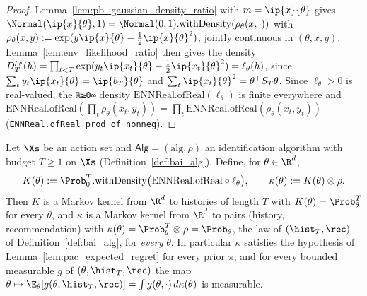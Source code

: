 \begin{proof}
\leanok
{}
Lemma~\ref{lem:pb_gaussian_density_ratio} with $m = \ip{x}{\theta}$ gives
$\Normal(\ip{x}{\theta},1) = \Normal(0,1).\mathrm{withDensity}(\rho_\theta(x,\cdot))$ with
$\rho_\theta(x,y) := \exp(y\ip{x}{\theta}-\tfrac12\ip{x}{\theta}^2)$, jointly continuous in
$(\theta,x,y)$. Lemma~\ref{lem:env_likelihood_ratio} then gives the density
$D_T^{\rho_\theta}(h) = \prod_{t<T}\exp(y_t\ip{x_t}{\theta}-\tfrac12\ip{x_t}{\theta}^2) = \ell_\theta(h)$,
since $\sum_ty_t\ip{x_t}{\theta} = \ip{b_T}{\theta}$ and
$\sum_t\ip{x_t}{\theta}^2 = \theta^\top S_T\theta$. Since $\ell_\theta > 0$ is real-valued, the
\texttt{ℝ≥0∞} density $\mathrm{ENNReal.ofReal}(\ell_\theta)$ is finite everywhere and
$\mathrm{ENNReal.ofReal}(\prod_t\rho_\theta(x_t,y_t)) = \prod_t\mathrm{ENNReal.ofReal}(\rho_\theta(x_t,y_t))$
(\texttt{ENNReal.ofReal\_prod\_of\_nonneg}).
\end{proof}

\begin{lemma}\label{lem:pb_kernel_of_likelihood}
\leanok
{}
Let $\Xs$ be an action set and $\mathsf{Alg} = (\mathrm{alg},\rho)$ an identification algorithm
with budget $T\ge1$ on $\Xs$ (Definition~\ref{def:bai_alg}). Define, for $\theta\in\R^d$,
\[
  K(\theta) := \Prob_0^T.\mathrm{withDensity}\big(\mathrm{ENNReal.ofReal}\circ\ell_\theta\big),
  \qquad \kappa(\theta) := K(\theta)\otimes\rho .
\]
Then $K$ is a Markov kernel from $\R^d$ to histories of length $T$ with $K(\theta) = \Prob_\theta^T$
for every $\theta$, and $\kappa$ is a Markov kernel from $\R^d$ to pairs (history,
recommendation) with $\kappa(\theta) = \Prob_\theta^T\otimes\rho = \Prob_\theta$, the law of
$(\hist_T,\rec)$ of Definition~\ref{def:bai_alg}, for \emph{every} $\theta$. In particular
$\kappa$ satisfies the hypothesis of Lemma~\ref{lem:pac_expected_regret} for every prior
$\pi$, and for every bounded measurable $g$ of $(\theta,\hist_T,\rec)$ the map
$\theta\mapsto\E_\theta[g(\theta,\hist_T,\rec)] = \int g(\theta,\cdot)\,d\kappa(\theta)$ is
measurable.
\end{lemma}

